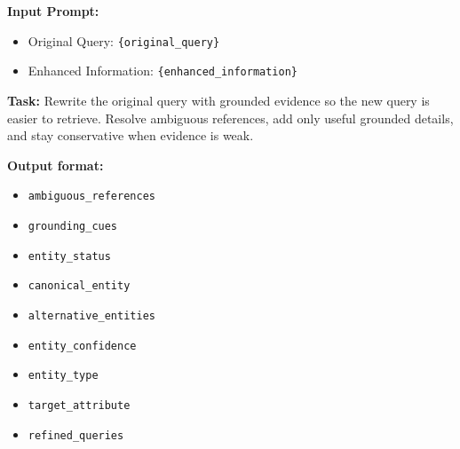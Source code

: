 \documentclass{article} %
\begin{document}
\begin{tcolorbox}[
  title=Example: Alignment Layer Prompt,
  coltitle=black,
  colbacktitle=blue!8,
  colback=blue!5,
  colframe=black,
  fonttitle=\bfseries,
  arc=2mm,
  boxrule=0.5pt,
  enhanced jigsaw,
  breakable,
  width=\linewidth,
  left=6pt,
  right=6pt,
  top=6pt,
  bottom=6pt
]

\textbf{Input Prompt:}

\begin{itemize}
  \item Original Query: \texttt{\{original\_query\}}
  \item Enhanced Information: \texttt{\{enhanced\_information\}}
\end{itemize}

\textbf{Task:}
Rewrite the original query with grounded evidence so the new query is easier to retrieve.
Resolve ambiguous references, add only useful grounded details, and stay conservative when evidence is weak.

\textbf{Output format:}

\begin{itemize}
  \item \texttt{ambiguous\_references}
  \item \texttt{grounding\_cues}
  \item \texttt{entity\_status}
  \item \texttt{canonical\_entity}
  \item \texttt{alternative\_entities}
  \item \texttt{entity\_confidence}
  \item \texttt{entity\_type}
  \item \texttt{target\_attribute}
  \item \texttt{refined\_queries}
\end{itemize}
\end{tcolorbox}
\end{document}

